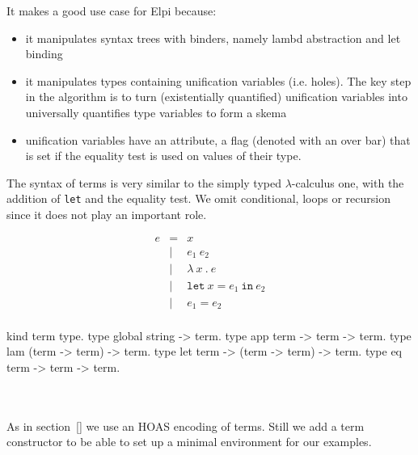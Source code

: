 \documentclass[a4paper, 11pt]{book}
\begin{document}
It makes a good use case for Elpi because:
\begin{itemize}
  \item it manipulates syntax trees with binders, namely lambd abstraction
    and let binding
  \item it manipulates types containing unification variables (i.e. holes).
    The key step in the algorithm is to turn (existentially quantified)
    unification variables into universally quantifies type variables to
    form a skema
  \item unification variables have an attribute, a flag (denoted with
    an over bar) that is set if the equality test is used on values
    of their type.
\end{itemize}

The syntax of terms is very similar to the simply typed $\lambda$-calculus
one, with the addition of \texttt{let} and the equality test. We omit
conditional, loops or recursion since it does not play an important role.

\begin{center}
\begin{minipage}{0.35\textwidth}
$$
\begin{array}{lrl}
  e & =     & x                                 \\
  & \vert & e_1\ e_2                            \\
  & \vert & \lambda\ x\ .\ e                    \\
  & \vert & \mathtt{let}\ x = e_1\ \mathtt{in}\ e_2 \\
  & \vert & e_1 = e_2 \\
\end{array}
$$
\end{minipage}
\begin{minipage}{0.55\textwidth}
\vspace{0.5em}
\begin{elpicodelj}
kind term type.
type global  string -> term.
type app term -> term -> term.
type lam (term -> term) -> term.
type let term -> (term -> term) -> term.
type eq  term -> term -> term.
\end{elpicodelj}
\end{minipage}
\end{center}
~\\  
~\\  
As in section~\ref{} we use an HOAS encoding of terms.
Still we add a  term constructor to
be able to set up a minimal environment for our examples.
\end{document}
